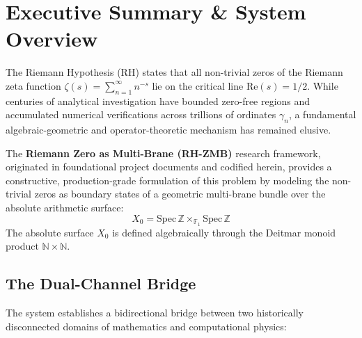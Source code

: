 \documentclass[11pt,a4paper]{article}
\theoremstyle{definition}
\theoremstyle{remark}
\begin{document}
\vspace{1em}

\tableofcontents
\newpage

\section{Executive Summary \& System Overview}

The Riemann Hypothesis (RH) states that all non-trivial zeros of the Riemann zeta function $\zeta(s) = \sum_{n=1}^\infty n^{-s}$ lie on the critical line $\mathrm{Re}(s) = 1/2$. While centuries of analytical investigation have bounded zero-free regions and accumulated numerical verifications across trillions of ordinates $\gamma_n$, a fundamental algebraic-geometric and operator-theoretic mechanism has remained elusive.

The \textbf{Riemann Zero as Multi-Brane (RH-ZMB)} research framework, originated in foundational project documents and codified herein, provides a constructive, production-grade formulation of this problem by modeling the non-trivial zeros as boundary states of a geometric multi-brane bundle over the absolute arithmetic surface:
\begin{equation}
X_0 = \mathrm{Spec}\,\mathbb{Z} \times_{\mathbb{F}_1} \mathrm{Spec}\,\mathbb{Z}
\end{equation}
The absolute surface $X_0$ is defined algebraically through the Deitmar monoid product $\mathbb{N} \times \mathbb{N}$.

\subsection{The Dual-Channel Bridge}
The system establishes a bidirectional bridge between two historically disconnected domains of mathematics and computational physics:
\end{document}
